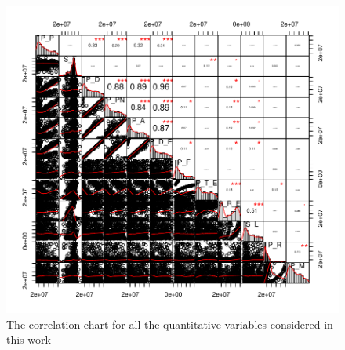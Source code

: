 \documentclass[
12pt, %
a4paper, %
oneside, %
headinclude,footinclude, %
BCOR5mm, %
]{scrartcl}
\begin{document}
\begin{figure}[h]
\begin{center}
\includegraphics[width=1\textwidth]{Pic/Corr_chart.pdf}
\caption{The correlation chart for all the quantitative variables considered in this work}
\label{Corr_chart}
\end{center}
\end{figure}
\end{document}
